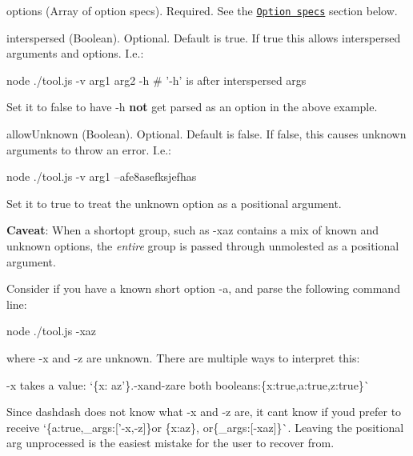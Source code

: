 \begin{DoxyItemize}
\item {\ttfamily options} (Array of option specs). Required. See the \href{#option-specs}{\tt Option specs} section below.
\item {\ttfamily interspersed} (Boolean). Optional. Default is true. If true this allows interspersed arguments and options. I.\+e.\+: \begin{DoxyVerb}  node ./tool.js -v arg1 arg2 -h   # '-h' is after interspersed args
\end{DoxyVerb}


Set it to false to have \textquotesingle{}-\/h\textquotesingle{} {\bfseries not} get parsed as an option in the above example.
\item {\ttfamily allow\+Unknown} (Boolean). Optional. Default is false. If false, this causes unknown arguments to throw an error. I.\+e.\+: \begin{DoxyVerb}  node ./tool.js -v arg1 --afe8asefksjefhas
\end{DoxyVerb}


Set it to true to treat the unknown option as a positional argument.

{\bfseries Caveat}\+: When a shortopt group, such as {\ttfamily -\/xaz} contains a mix of known and unknown options, the {\itshape entire} group is passed through unmolested as a positional argument.

Consider if you have a known short option {\ttfamily -\/a}, and parse the following command line\+: \begin{DoxyVerb}  node ./tool.js -xaz
\end{DoxyVerb}


where {\ttfamily -\/x} and {\ttfamily -\/z} are unknown. There are multiple ways to interpret this\+:
\begin{DoxyEnumerate}
\item {\ttfamily -\/x} takes a value\+: `\{x\+: \textquotesingle{}az'\}{.}-\/x{\ttfamily and}-\/z{\ttfamily are both booleans\+:}\{x\+:true,a\+:true,z\+:true\}\`{}
\end{DoxyEnumerate}

Since dashdash does not know what {\ttfamily -\/x} and {\ttfamily -\/z} are, it can\textquotesingle{}t know if you\textquotesingle{}d prefer to receive `\{a\+:true,\+\_\+args\+:\mbox{[}'-\/x\textquotesingle{},\textquotesingle{}-\/z\textquotesingle{}\mbox{]}\}{\ttfamily or }\{x\+:\textquotesingle{}az\textquotesingle{}\}{\ttfamily , or}\{\+\_\+args\+:\mbox{[}\textquotesingle{}-\/xaz\textquotesingle{}\mbox{]}\}\`{}. Leaving the positional arg unprocessed is the easiest mistake for the user to recover from.
\end{DoxyItemize}

